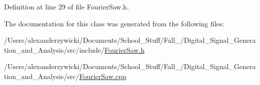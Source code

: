 Definition at line 29 of file Fourier\+Saw.\+h.



The documentation for this class was generated from the following files\+:\begin{DoxyCompactItemize}
\item 
/\+Users/alexanderzywicki/\+Documents/\+School\+\_\+\+Stuff/\+Fall\+\_/\+Digital\+\_\+\+Signal\+\_\+\+Generation\+\_\+and\+\_\+\+Analysis/src/include/\hyperlink{FourierSaw_8h}{Fourier\+Saw.\+h}\item 
/\+Users/alexanderzywicki/\+Documents/\+School\+\_\+\+Stuff/\+Fall\+\_/\+Digital\+\_\+\+Signal\+\_\+\+Generation\+\_\+and\+\_\+\+Analysis/src/\hyperlink{FourierSaw_8cpp}{Fourier\+Saw.\+cpp}\end{DoxyCompactItemize}
